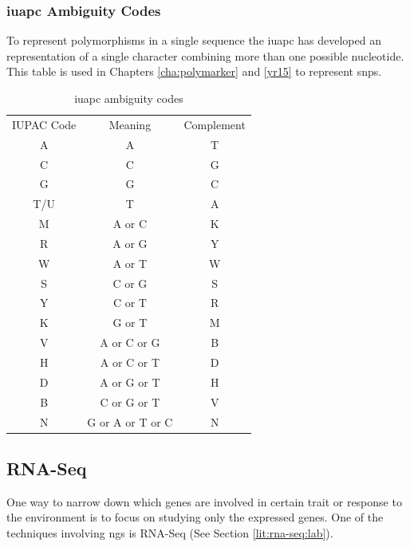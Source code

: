 \subsubsection{\gls{iuapc} Ambiguity Codes}
\label{lit:ambiguity}
To represent polymorphisms in a single sequence the \gls{iuapc} has developed an representation of a single character combining more than one possible nucleotide. 
This table is used in Chapters \ref{cha:polymarker} and \ref{yr15} to represent \glspl{snp}.

\begin{table}
\caption{\gls{iuapc} ambiguity codes}
\centering
\begin{tabular}{ccc}
\toprule
IUPAC Code & Meaning & Complement \\
A & A & T \\
C & C & G \\
G & G & C \\
T/U & T & A \\
M & A or C & K \\
R & A or G & Y \\
W & A or T & W \\
S & C or G & S \\
Y & C or T & R \\
K & G or T & M \\
V & A or C or G & B \\
H & A or C or T & D \\
D & A or G or T & H \\
B & C or G or T & V \\
N & G or A or T or C & N \\
\bottomrule
\end{tabular}
\end{table}

\subsection{RNA-Seq}
\label{lit:RNASeq:bioinf}

One way to narrow down which genes are involved in certain trait or response to the environment is to focus on studying only the expressed genes. One of the techniques involving \gls{ngs} is RNA-Seq (See Section \ref{lit:rna-seq:lab}). %

